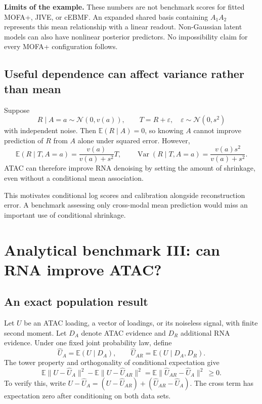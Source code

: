 \documentclass[11pt,a4paper]{article}
\newcommand{\E}{\mathbb E}
\newcommand{\N}{\mathcal N}
\newcommand{\Var}{\operatorname{Var}}
\numberwithin{equation}{section}
\begin{document}
\textbf{Limits of the example.} These numbers are not benchmark scores
for fitted MOFA+, JIVE, or cEBMF. An expanded shared basis containing
\(A_1A_2\) represents this mean relationship with a linear readout.
Non-Gaussian latent models can also have nonlinear posterior predictors.
No impossibility claim for every MOFA+ configuration follows.

\subsection{Useful dependence can affect variance rather than mean}
Suppose
\[
R\mid A=a\sim\N(0,v(a)),\qquad T=R+\varepsilon,\quad
\varepsilon\sim\N(0,s^2)
\]
with independent noise. Then \(\E(R\mid A)=0\), so knowing \(A\)
cannot improve prediction of \(R\) from \(A\) alone under squared error.
However,
\[
\E(R\mid T,A=a)=\frac{v(a)}{v(a)+s^2}T,\qquad
\Var(R\mid T,A=a)=\frac{v(a)s^2}{v(a)+s^2}.
\]
ATAC can therefore improve RNA denoising by setting the amount of
shrinkage, even without a conditional mean association.

This motivates conditional log scores and calibration alongside
reconstruction error. A benchmark assessing only cross-modal mean
prediction would miss an important use of conditional shrinkage.

\clearpage
\section{Analytical benchmark III: can RNA improve ATAC?}

\subsection{An exact population result}
Let \(U\) be an ATAC loading, a vector of loadings, or its noiseless
signal, with finite second moment. Let \(D_A\) denote ATAC evidence and
\(D_R\) additional RNA evidence. Under one fixed joint probability law,
define
\[
\widehat U_A=\E(U\mid D_A),\qquad
\widehat U_{AR}=\E(U\mid D_A,D_R).
\]
The tower property and orthogonality of conditional expectation give
\begin{equation}\label{eq:risk}
\boxed{\;
\E\|U-\widehat U_A\|^2-\E\|U-\widehat U_{AR}\|^2
=\E\|\widehat U_{AR}-\widehat U_A\|^2\ \geq 0.
\;}
\end{equation}
To verify this, write
\(U-\widehat U_A=(U-\widehat U_{AR})+
(\widehat U_{AR}-\widehat U_A)\).
The cross term has expectation zero after conditioning on both data sets.
\end{document}

